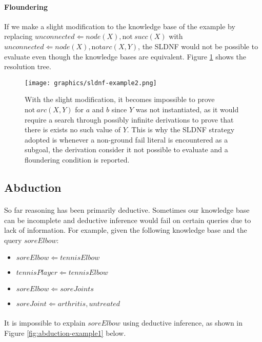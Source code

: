 \documentclass{article}
\theoremstyle{plain}
\theoremstyle{definition}
\begin{document}
\begin{multicols}{2}
\paragraph{Floundering} If we make a slight modification to the knowledge base of the example by replacing $unconnected \Leftarrow node(X), \text{not}\ succ(X)$ with $unconnected \Leftarrow node(X), \text{not} arc(X, Y)$, the SLDNF would not be possible to evaluate even though the knowledge bases are equivalent. Figure \ref{fig:sldnf-example2} shows the resolution tree.

\begin{figure}[H]
\centering
\texttt{[image: graphics/sldnf-example2.png]}
\caption{With the slight modification, it becomes impossible to prove $\text{not}\ arc(X, Y)$ for $a$ and $b$ since $Y$ was not instantiated, as it would require a search through possibly infinite derivations to prove that there is exists no such value of $Y$. This is why the SLDNF strategy adopted is whenever a non-ground fail literal is encountered as a subgoal, the derivation consider it not possible to evaluate and a floundering condition is reported.}
\label{fig:sldnf-example2}
\end{figure}

\subsection{Abduction}

\paragraph{} So far reasoning has been primarily deductive. Sometimes our knowledge base can be incomplete and deductive inference would fail on certain queries due to lack of information. For example, given the following knowledge base and the query $soreElbow$:

\begin{itemize}
\setlength\itemsep{0.1em}
\item[] $soreElbow \Leftarrow tennisElbow$
\item[] $tennisPlayer \Leftarrow tennisElbow$
\item[] $soreElbow \Leftarrow soreJoints$
\item[] $soreJoint \Leftarrow arthritis, untreated$
\end{itemize}

\paragraph{} It is impossible to explain $soreElbow$ using deductive inference, as shown in Figure \ref{fig:abduction-example1} below.


\end{multicols}
\end{document}
